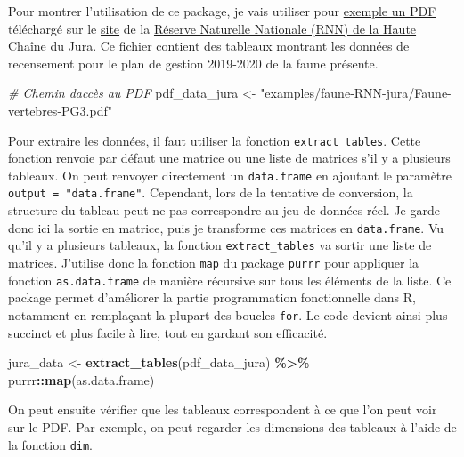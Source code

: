 \documentclass[
  french,
]{book}
\newenvironment{Shaded}{\begin{snugshade}}{\end{snugshade}}
\newcommand{\CommentTok}[1]{\textcolor[rgb]{0.56,0.35,0.01}{\textit{#1}}}
\newcommand{\KeywordTok}[1]{\textcolor[rgb]{0.13,0.29,0.53}{\textbf{#1}}}
\newcommand{\NormalTok}[1]{#1}
\newcommand{\OperatorTok}[1]{\textcolor[rgb]{0.81,0.36,0.00}{\textbf{#1}}}
\newcommand{\StringTok}[1]{\textcolor[rgb]{0.31,0.60,0.02}{#1}}
\begin{document}
Pour montrer l'utilisation de ce package, je vais utiliser pour
\href{examples/faune-RNN-jura/Faune-vertebres-PG3.pdf}{exemple un PDF} téléchargé sur
le \href{https://www.rnn-hautechainedujura.fr/patrimoine-naturel/faune/}{site} de la
\href{https://www.rnn-hautechainedujura.fr/}{Réserve Naturelle Nationale (RNN) de la Haute Chaîne du Jura}.
Ce fichier contient des tableaux montrant les données de recensement pour le
plan de gestion 2019-2020 de la faune présente.

\begin{Shaded}
\begin{Highlighting}[]
\CommentTok{\# Chemin d\textquotesingle{}accès au PDF}
\NormalTok{pdf\_data\_jura \textless{}{-}}\StringTok{ "examples/faune{-}RNN{-}jura/Faune{-}vertebres{-}PG3.pdf"}
\end{Highlighting}
\end{Shaded}

Pour extraire les données, il faut utiliser la fonction \texttt{extract\_tables}. Cette
fonction renvoie par défaut une matrice ou une liste de matrices s'il y a
plusieurs tableaux. On peut renvoyer directement un \texttt{data.frame} en ajoutant le
paramètre \texttt{output\ =\ "data.frame"}. Cependant, lors de la tentative de
conversion, la structure du tableau peut ne pas correspondre au jeu de données
réel. Je garde donc ici la sortie en matrice, puis je transforme ces matrices en
\texttt{data.frame}. Vu qu'il y a plusieurs tableaux, la fonction \texttt{extract\_tables} va
sortir une liste de matrices. J'utilise donc la fonction \texttt{map} du package
\href{https://purrr.tidyverse.org/}{\texttt{purrr}} pour appliquer la fonction
\texttt{as.data.frame} de manière récursive sur tous les éléments de la liste. Ce
package permet d'améliorer la partie programmation fonctionnelle dans R,
notamment en remplaçant la plupart des boucles \texttt{for}. Le code devient ainsi plus
succinct et plus facile à lire, tout en gardant son efficacité.

\begin{Shaded}
\begin{Highlighting}[]
\NormalTok{jura\_data \textless{}{-}}\StringTok{ }\KeywordTok{extract\_tables}\NormalTok{(pdf\_data\_jura) }\OperatorTok{\%\textgreater{}\%}\StringTok{ }
\StringTok{  }\NormalTok{purrr}\OperatorTok{::}\KeywordTok{map}\NormalTok{(as.data.frame)}
\end{Highlighting}
\end{Shaded}

On peut ensuite vérifier que les tableaux correspondent à ce que l'on peut voir sur le PDF. Par exemple, on peut regarder les dimensions des tableaux à l'aide de la fonction \texttt{dim}.
\end{document}
